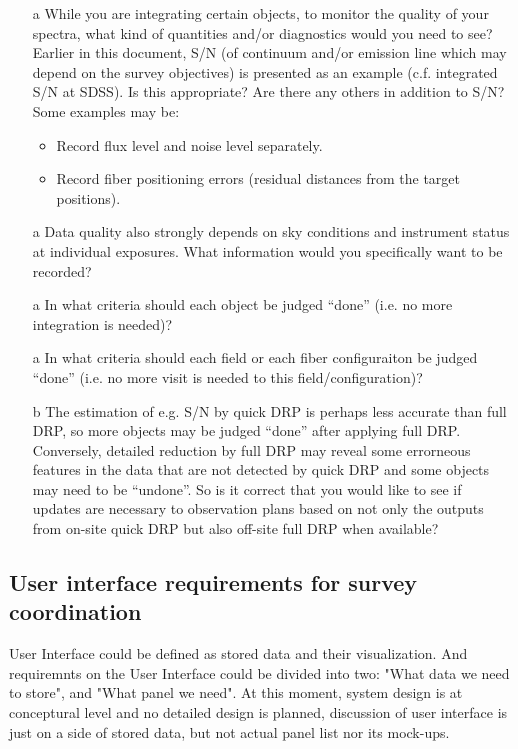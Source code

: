 \documentclass[a4paper,notitlepage]{article}
\begin{document}
\begin{enumerate}
 \item[a] While you are integrating certain objects, to monitor the
      quality of your spectra, what kind of quantities and/or
      diagnostics would you need to see? Earlier in this document,
      S/N (of continuum and/or emission line which may depend on the
      survey objectives) is presented as an example (c.f. integrated
      S/N at SDSS). Is this appropriate? Are there any others in
      addition to S/N? Some examples may be:
      \begin{itemize}
       \item Record flux level and noise level separately.
       \item Record fiber positioning errors (residual distances
         from the target positions).
      \end{itemize}
 \item[a] Data quality also strongly depends on sky conditions and
      instrument status at individual exposures. What information
      would you specifically want to be recorded?
 \item[a] In what criteria should each object be judged ``done''
      (i.e. no more integration is needed)?
 \item[a] In what criteria should each field or each fiber configuraiton
      be judged ``done'' (i.e. no more visit is needed to this
      field/configuration)?
 \item[b] The estimation of e.g. S/N by quick DRP is perhaps less
      accurate than full DRP, so more objects may be judged ``done''
      after applying full DRP. Conversely, detailed reduction by
      full DRP may reveal some errorneous features in the data that
      are not detected by quick DRP and some objects may need to be
      ``undone''. So is it correct that you would like to see if
      updates are necessary to observation plans based on not only
      the outputs from on-site quick DRP but also off-site full DRP
      when available?
\end{enumerate}

\subsection{User interface requirements for survey coordination}

User Interface could be defined as stored data and their
visualization. And requiremnts on the User Interface could be divided
into two: "What data we need to store", and "What panel we need".  At
this moment, system design is at conceptural level and no detailed
design is planned, discussion of user interface is just on a side of
stored data, but not actual panel list nor its mock-ups.
\end{document}
